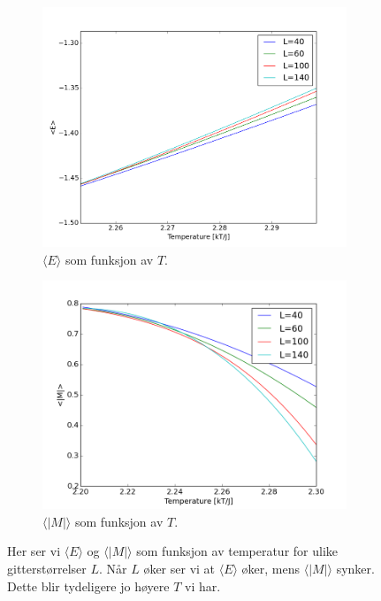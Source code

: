 \documentclass[11pt,a4paper]{article}
\begin{document}
\FloatBarrier
\begin{figure}[!ht]
\centering
\begin{subfigure}{.55\textwidth}
  \centering
  \includegraphics[width=1.1\linewidth]{4eE.png}
  \caption{$\langle E \rangle$ som funksjon av $T$.}
  \label{hist1}
\end{subfigure}%
\begin{subfigure}{.55\textwidth}
  \centering
  \includegraphics[width=1.1\linewidth]{4eM.png}
  \caption{ $\langle |M| \rangle$ som funksjon av $T$. }
  \label{hist2}
\end{subfigure}
\caption{ Her ser vi $\langle E \rangle$ og $\langle |M| \rangle$ som funksjon av temperatur for ulike gitterstørrelser $L$. Når $L$ øker ser vi at  $\langle E \rangle$ øker, mens $\langle |M| \rangle$ synker. Dette blir tydeligere jo høyere $T$ vi har.   }
\label{klaks1}
\end{figure}
\FloatBarrier
\end{document}
